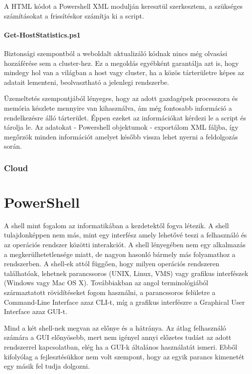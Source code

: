 \documentclass[12pt,oneside,justify,table]{book}
\begin{document}
A HTML kódot a Powershell XML modulján keresztül szerkesztem, a szükséges számításokat a frissítéskor számítja ki a script.

\subsubsection{Get-HostStatistics.ps1}
Biztonsági szempontból a weboldalt aktualizáló kódnak nincs még olvasási hozzáférése sem a cluster-hez. Ez a megoldás egyébként garantálja azt is, hogy mindegy hol van a világban a host vagy cluster, ha a közös tárterületre képes az adatait lementeni, beolvasztható a jelenlegi rendszerbe. 

Üzemeltetés szempontjából lényeges, hogy az adott gazdagépek processzora és memória készlete mennyire van kihasználva, ám még fontosabb információ a rendelkezésre álló tárterület. Éppen ezeket az információkat kérdezi le a script és tárolja le. Az adatokat -  Powershell objektumok - exportálom XML fáljba, így megőrzök minden információt amelyet később vissza lehet nyerni a feldolgozás során.

\subsection{Cloud}
\noindent


\chapter{PowerShell}
A shell mint fogalom az informatikában a kezdetektől fogva létezik. A shell tulajdonképpen nem más, mint egy interfész amely lehetővé teszi a felhasználó és az operációs rendszer közötti interakciót. A shell lényegében nem egy alkalmazás a megkerülhetetlensége miatt, de nagyon hasonló bármely más folyamathoz a rendszerben. A shell-ek attól függően, hogy milyen operációs rendszeren találhatóak, lehetnek parancssoros (UNIX, Linux, VMS) vagy grafikus interfészek (Windows vagy Mac OS X). Továbbiakban az angol terminológiából származtatott rövidítéseket fogom használni, a parancssoros felületre a Command-Line Interface azaz CLI-t, míg a grafikus interfészre a Graphical User Interface azaz GUI-t.

Mind a két shell-nek megvan az előnye és a hátránya. Az átlag felhasználó számára a GUI előnyösebb, mert nem igényel annyi előzetes tudást az adott rendszerrel kapcsolatban, elég ha a GUI-k általános használatát ismeri. Ebből kifolyólag a fejlesztésükkor nem volt szempont, hogy az egyik parancs kimenetét egy másik fel tudja dolgozni. 
\end{document}
